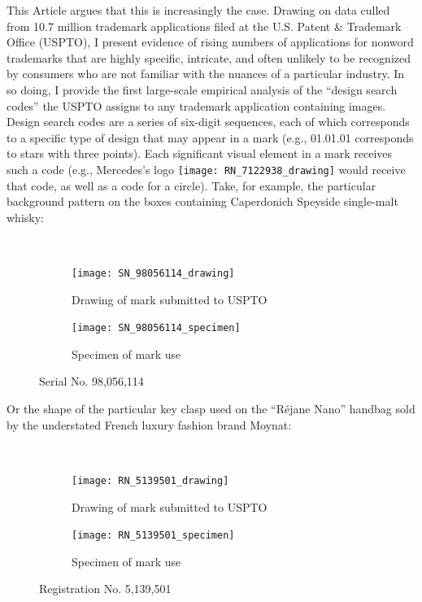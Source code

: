 \documentclass[letterpaper, 11pt, oneside]{article}
\begin{document}
This Article argues that this is increasingly the case. Drawing on data culled from 10.7 million trademark applications filed at the U.S. Patent \& Trademark Office (USPTO), I present evidence of rising numbers of applications for nonword trademarks that are highly specific, intricate, and often unlikely to be recognized by consumers who are not familiar with the nuances of a particular industry. In so doing, I provide the first large-scale empirical analysis of the ``design search codes'' the USPTO assigns to any trademark application containing images. Design search codes are a series of six-digit sequences, each of which corresponds to a specific type of design that may appear in a mark (e.g., 01.01.01 corresponds to stars with three points). Each significant visual element in a mark receives such a code (e.g., Mercedes's logo \texttt{[image: RN\_7122938\_drawing]} would receive that code, as well as a code for a circle). Take, for example, the particular background pattern on the boxes containing Caperdonich Speyside single-malt whisky: \par \

\begin{figure}[H]
\centering
\begin{subfigure}[h]{0.2\linewidth}
\texttt{[image: SN\_98056114\_drawing]} \
\caption{Drawing of mark submitted to USPTO}
\end{subfigure}
\hspace{30pt}
\begin{subfigure}[h]{0.225\linewidth}
\texttt{[image: SN\_98056114\_specimen]} \
\caption{Specimen of mark use}
\end{subfigure}
\caption*{Serial No. 98,056,114}
\end{figure}
\par

\noindent Or the shape of the particular key clasp used on the ``Réjane Nano'' handbag sold by the understated French luxury fashion brand Moynat: \par \

\begin{figure}[H]
\centering
\begin{subfigure}[h]{0.4\linewidth}
\texttt{[image: RN\_5139501\_drawing]} \
\caption{Drawing of mark submitted to USPTO}
\end{subfigure}
\hspace{30pt}
\begin{subfigure}[h]{0.3\linewidth}
\texttt{[image: RN\_5139501\_specimen]} \
\caption{Specimen of mark use}
\end{subfigure}
\caption*{Registration No. 5,139,501}
\end{figure}
\par
\end{document}
